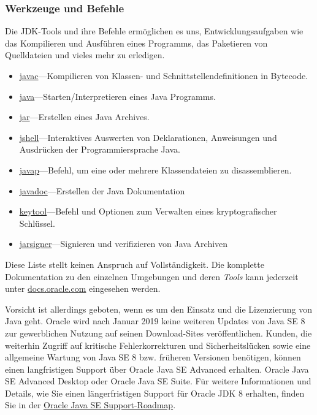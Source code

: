 \begin{frame}[fragile]
    \frametitle<presentation>{Werkzeuge und Befehle}

    Die JDK-Tools und ihre Befehle ermöglichen es uns,
    Entwicklungsaufgaben wie das Kompilieren und Ausführen eines Programms,
    das Paketieren von Quelldateien und vieles mehr zu erledigen.

    \begin{itemize}
        \item\href{https://docs.oracle.com/en/java/javase/11/tools/javac.html}
        {javac}---Kompilieren von Klassen- und Schnittstellendefinitionen
        in Bytecode.
        \item\href{https://docs.oracle.com/en/java/javase/11/tools/java.html}
        {java}---Starten/Interpretieren eines Java Programms.
        \item\href{https://docs.oracle.com/en/java/javase/11/tools/jar.html}
        {jar}---Erstellen eines Java Archives.
        \item\href{https://docs.oracle.com/en/java/javase/11/tools/jshell.html}
        {jshell}---Interaktives Auswerten von Deklarationen, Anweisungen und
        Ausdrücken der Programmiersprache Java.
        \item<article>\href{https://docs.oracle.com/en/java/javase/11/tools/javap.html}
        {javap}---Befehl, um eine oder mehrere Klassendateien zu
        disassemblieren.
        \item<article>\href{https://docs.oracle.com/en/java/javase/11/tools/javadoc.html}
        {javadoc}---Erstellen der Java Dokumentation
        \item<article>\href{https://docs.oracle.com/en/java/javase/11/tools/keytool.html}
        {keytool}---Befehl und Optionen zum Verwalten eines kryptografischer Schlüssel.
        \item<article>\href{https://docs.oracle.com/en/java/javase/11/tools/jarsigner.html}
        {jarsigner}---Signieren und verifizieren von Java Archiven
    \end{itemize}

\end{frame}


Diese Liste stellt keinen Anspruch auf Vollständigkeit. Die komplette Dokumentation
zu den einzelnen Umgebungen und deren {\em Tools} kann jederzeit unter
\href{https://docs.oracle.com/en/java/}{docs.oracle.com} eingesehen werden.

Vorsicht ist allerdings geboten, wenn es um den Einsatz und die Lizenzierung von Java geht.
Oracle wird nach Januar 2019 keine weiteren Updates von Java SE 8 zur
gewerblichen Nutzung auf seinen Download-Sites veröffentlichen. Kunden, die
weiterhin Zugriff auf kritische Fehlerkorrekturen und Sicherheitslücken sowie
eine allgemeine Wartung von Java SE 8 bzw. früheren Versionen benötigen,
können einen langfristigen Support über Oracle Java SE Advanced erhalten.
Oracle Java SE Advanced Desktop oder Oracle Java SE Suite. Für weitere
Informationen und Details, wie Sie einen längerfristigen Support für Oracle
JDK 8 erhalten, finden Sie in der
\href{http://www.oracle.com/technetwork/java/eol-135779.html}
{Oracle Java SE Support-Roadmap}.

